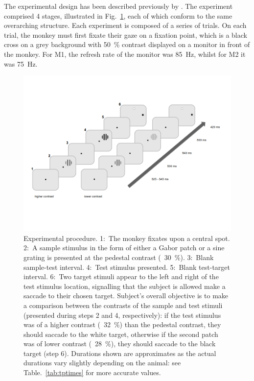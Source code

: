 The experimental design has been described previously by \cite{Chen2013,Chen2014}.
The experiment comprised 4 stages, illustrated in Fig.~\ref{fig:pltask1}, each of which conform to the same overarching structure.
Each experiment is composed of a series of trials.
On each trial, the monkey must first fixate their gaze on a fixation point, which is a black cross on a grey background with \SI{50}{\percent} contrast displayed on a monitor in front of the monkey.
For \ac{M1}, the refresh rate of the monitor was \SI{85}{Hz}, whilst for \ac{M2} it was \SI{75}{Hz}.

\begin{figure}[htbp]
\begin{center}
\includegraphics[width=\linewidth]{figs/info/PLtask1.png}
\end{center}
\caption{
Experimental procedure.
1:~The monkey fixates upon a central spot.
2:~A sample stimulus in the form of either a Gabor patch or a sine grating is presented at the pedestal contrast (\eg{}~\SI{30}{\percent}).
3:~Blank sample-test interval.
4:~Test stimulus presented.
5:~Blank test-target interval.
6:~Two target stimuli appear to the left and right of the test stimulus location, signalling that the subject is allowed make a saccade to their chosen target.
Subject's overall objective is to make a comparison between the contrasts of the sample and test stimuli (presented during steps 2 and 4, respectively): if the test stimulus was of a higher contrast (\eg{}~\SI{32}{\percent}) than the pedestal contrast, they should saccade to the white target, otherwise if the second patch was of lower contrast (\eg{}~\SI{28}{\percent}), they should saccade to the black target (step 6).
Durations shown are approximates as the actual durations vary slightly depending on the animal: see Table.~\ref{tab:tptimes} for more accurate values.}
\label{fig:pltask1}
\end{figure}

